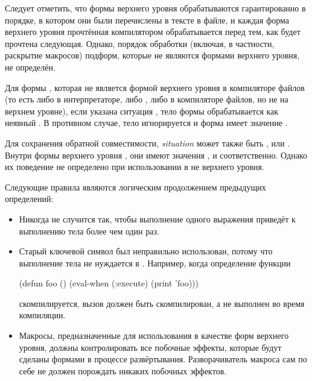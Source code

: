 \begin{defspec}
Следует отметить, что формы верхнего уровня обрабатываются гарантированно в
порядке, в котором они были перечислены в тексте в файле, и каждая форма
верхнего уровня прочтённая компилятором обрабатывается перед тем, как будет
прочтена следующая.
Однако, порядок обработки (включая, в частности, раскрытие макросов) подформ,
которые не являются формами верхнего уровня, не определён.

Для формы , которая не является формой верхнего уровня в
компиляторе файлов (то есть либо в интерпретаторе, либо , либо в
компиляторе файлов, но не на верхнем уровне), если указана ситуация
, тело формы обрабатывается как неявный . В противном
случае, тело игнорируется и форма  имеет значение .

Для сохранения обратной совместимости, \emph{situation} может также быть
,  или .
Внутри формы верхнего уровня , они имеют значения
,  и  соответственно.
Однако их поведение не определено при использовании в  не
верхнего уровня.

Следующие правила являются логическим продолжением предыдущих определений:

\begin{itemize}

\item Никогда не случится так, чтобы выполнение одного 
  выражения приведёт к выполнению тела более чем один раз.

\item Старый ключевой символ  был неправильно использован, потому
  что выполнение тела не нуждается в . Например, когда определение
  функции
  \begin{lisp}
    (defun foo () (eval-when (:execute) (print 'foo)))
  \end{lisp}
  скомпилируется,
  вызов  должен быть скомпилирован, а не выполнен во время
  компиляции.

\item Макросы, предназначенные для использования в качестве форм верхнего
  уровня, должны контролировать все побочные эффекты, которые будут сделаны
  формами в процессе развёртывания.
  Разворачиватель макроса сам по себе не должен порождать никаких побочных
  эффектов.
  

\end{itemize}
\end{defspec}
